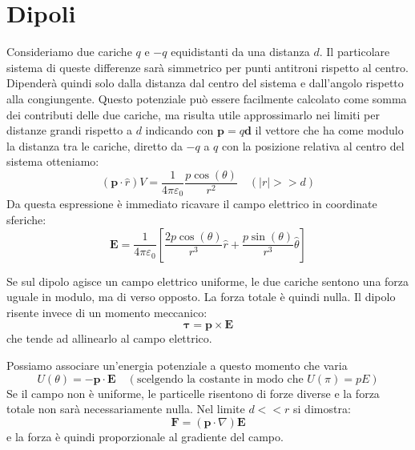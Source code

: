 \documentclass{article}
\begin{document}
\section*{Dipoli}

Consideriamo due cariche \( q \) e \( -q \) equidistanti da una distanza \( d \). Il particolare sistema di queste differenze sarà simmetrico per punti antitroni rispetto al centro. Dipenderà quindi solo dalla distanza dal centro del sistema e dall'angolo rispetto alla congiungente. Questo potenziale può essere facilmente calcolato come somma dei contributi delle due cariche, ma risulta utile approssimarlo nei limiti per distanze grandi rispetto a \( d \) indicando con \( \mathbf{p} = q\mathbf{d} \) il vettore che ha come modulo la distanza tra le cariche, diretto da \( -q \) a \( q \) con la posizione relativa al centro del sistema otteniamo:
\[
(\mathbf{p} \cdot \hat{r}) V = \frac{1}{4\pi\varepsilon_0} \frac{p \cos(\theta)}{r^2} \quad (|r| >> d)
\]
Da questa espressione è immediato ricavare il campo elettrico in coordinate sferiche:
\[
\mathbf{E} = \frac{1}{4\pi\varepsilon_0} \left[ \frac{2p \cos(\theta)}{r^3} \hat{r} + \frac{p \sin(\theta)}{r^3} \hat{\theta} \right]
\]

Se sul dipolo agisce un campo elettrico uniforme, le due cariche sentono una forza uguale in modulo, ma di verso opposto. La forza totale è quindi nulla. Il dipolo risente invece di un momento meccanico:
\[
\mathbf{\tau} = \mathbf{p} \times \mathbf{E}
\]
che tende ad allinearlo al campo elettrico.

Possiamo associare un'energia potenziale a questo momento che varia
\[
U(\theta) = -\mathbf{p} \cdot \mathbf{E} \quad (\text{scelgendo la costante in modo che } U(\pi) = pE)
\]
Se il campo non è uniforme, le particelle risentono di forze diverse e la forza totale non sarà necessariamente nulla. Nel limite \( d << r \) si dimostra:
\[
\mathbf{F} = (\mathbf{p} \cdot \nabla) \mathbf{E}
\]
e la forza è quindi proporzionale al gradiente del campo.




\newpage
\Index
\end{document}
